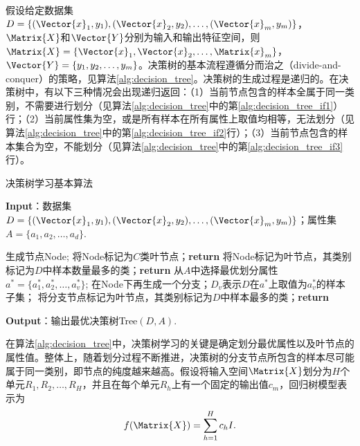 假设给定数据集$D=\{(\Vector{x}_1,y_1),(\Vector{x}_2,y_2),\ldots,(\Vector{x}_m,y_m)\}$，$\Matrix{X}$和$\Vector{Y}$分别为输入和输出特征空间，则$\Matrix{X}=\{\Vector{x}_1,\Vector{x}_2,\ldots,\Matrix{x}_m\}$，$\Vector{Y}=\{y_1,y_2,\ldots,y_m\}$。决策树的基本流程遵循分而治之（divide-and-conquer）的策略，见算法\ref{alg:decision_tree}。决策树的生成过程是递归的。在决策树中，有以下三种情况会出现递归返回：（1）当前节点包含的样本全属于同一类别，不需要进行划分（见算法\ref{alg:decision_tree}中的第\ref{alg:decision_tree_if1}）行；（2）当前属性集为空，或是所有样本在所有属性上取值均相等，无法划分（见算法\ref{alg:decision_tree}中的第\ref{alg:decision_tree_if2}行）；（3）当前节点包含的样本集合为空，不能划分（见算法\ref{alg:decision_tree}中的第\ref{alg:decision_tree_if3}行）。
\begin{algorithm}[!htbp]
  \small
  \caption{决策树学习基本算法}\label{alg:decision_tree}
  \textbf{Input}：{数据集$D=\{(\Vector{x}_1,y_1),(\Vector{x}_2,y_2),\ldots,(\Vector{x}_m,y_m)\}$；属性集$A=\{a_1,a_2,\ldots,a_d\}$.}
  \begin{algorithmic}[1]
    \State 生成节点Node;
    \State 将Node标记为$C$类叶节点；\textbf{return}\label{alg:decision_tree_if1}
    \EndIf
    \State 将Node标记为叶节点，其类别标记为$D$中样本数量最多的类；\textbf{return}\label{alg:decision_tree_if2}
    \EndIf
    \State 从$A$中选择最优划分属性$a^*=\{a_1^*,a_2^*,\ldots,a_v^*\}$;
      \State 在Node下再生成一个分支；$D_v$表示$D$在$a^*$上取值为$a_v^*$的样本子集；
      \State 将分支节点标记为叶节点，其类别标记为$D$中样本最多的类；\textbf{return} \label{alg:decision_tree_if3}
      \EndIf 
    \EndFor
    \EndProcedure
  \end{algorithmic}
  \textbf{Output}：{输出最优决策树Tree$(D,A)$.}
\end{algorithm}

在算法\ref{alg:decision_tree}中，决策树学习的关键是确定划分最优属性以及叶节点的属性值。整体上，随着划分过程不断推进，决策树的分支节点所包含的样本尽可能属于同一类别，即节点的纯度越来越高。假设将输入空间$\Matrix{X}$划分为$H$个单元$R_1,R_2,\ldots,R_H$，并且在每个单元$R_h$上有一个固定的输出值$c_m$，回归树模型表示为
\begin{equation}
  \label{eq:decision_tree}
  f(\Matrix{X})=\sum_{h=1}^{H}c_hI.
\end{equation}

